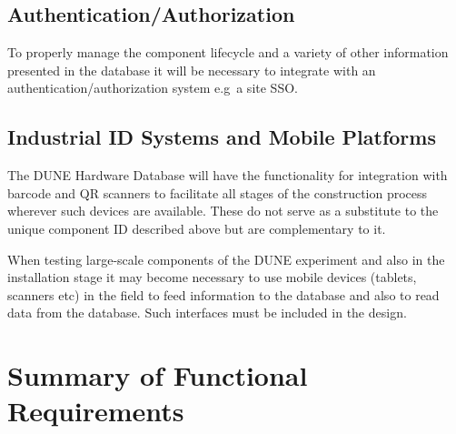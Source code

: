 \documentclass[pdftex,12pt,letter]{article}
\begin{document}
\subsection{Authentication/Authorization}
To properly manage the component lifecycle and a variety of other information presented in the database it will be necessary
to integrate with an authentication/authorization system e.g\, a site SSO.

\subsection{Industrial ID Systems and Mobile Platforms}

The DUNE Hardware Database will have the functionality for integration with barcode and QR scanners to facilitate
all stages of the construction process wherever such devices are available. These do not serve as a substitute to the
unique component ID described above but are complementary to it.

When testing large-scale components of the DUNE experiment and also in the installation stage
it may become necessary to use mobile devices (tablets, scanners etc) in the field to feed information to the database
and also to read data from the database. Such interfaces must be included in the design.

\section{Summary of Functional Requirements}
\end{document}
